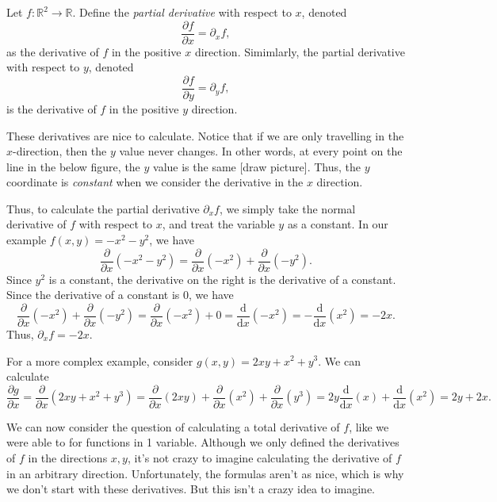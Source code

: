 \begin{definition}\label{dfn:1-1}
	Let $f : \mathbb{R} ^2 \to \mathbb{R} $. Define the \emph{partial derivative} with respect to $x$, denoted
	\[
		\frac{\partial f}{\partial x} =\partial _xf,
	\]
	as the derivative of $f$ in the positive $x$ direction. Simimlarly, the partial derivative with respect to $y$, denoted
	\[
		\frac{\partial f}{\partial y} =\partial _yf,
	\]
	is the derivative of $f$ in the positive $y$ direction.
\end{definition}


These derivatives are nice to calculate. Notice that if we are only travelling in the $x$-direction, then the $y$ value never changes. In other words, at every point on the line in the below figure, the $y$ value is the same [draw picture]. Thus, the $y$ coordinate is \emph{constant} when we consider the derivative in the $x$ direction.

Thus, to calculate the partial derivative $\partial _xf$, we simply take the normal derivative of $f$ with respect to $x$, and treat the variable $y$ as a constant. In our example $f(x,y) = -x^2 - y^2$, we have
\[
	\frac{\partial }{\partial x} \left( -x^2-y^2 \right) = \frac{\partial }{\partial x} \left( -x^2 \right)  + \frac{\partial }{\partial x} \left( -y^2 \right) 
.\]
Since $y^2$ is a constant, the derivative on the right is the derivative of a constant. Since the derivative of a constant is 0, we have
\[
	\frac{\partial}{\partial x} \left( -x^2 \right) + \frac{\partial }{\partial x} \left( -y^2 \right)  = \frac{\partial }{\partial x} \left( -x^2 \right)+0 = \frac{\mathrm{d}}{\mathrm{d}x} \left( -x^2 \right) =- \frac{\mathrm{d}}{\mathrm{d}x} \left( x^2 \right) =-2x
.\]
Thus, $\partial _xf=-2x$.

For a more complex example, consider $g(x,y) = 2xy + x^2 + y^3$. We can calculate
\[
	\frac{\partial g}{\partial x} = \frac{\partial }{\partial x} \left( 2xy+x^2+y^3 \right) = \frac{\partial }{\partial x} (2xy) + \frac{\partial }{\partial x} \left( x^2 \right) + \frac{\partial }{\partial x} \left( y^3 \right) =2y \frac{\mathrm{d}}{\mathrm{d}x} (x) + \frac{\mathrm{d}}{\mathrm{d}x} \left( x^2 \right) =2y + 2x
.\]

We can now consider the question of calculating a total derivative of $f$, like we were able to for functions in 1 variable. Although we only defined the derivatives of $f$ in the directions $x,y$, it's not crazy to imagine calculating the derivative of $f$ in an arbitrary direction. Unfortunately, the formulas aren't as nice, which is why we don't start with these derivatives. But this isn't a crazy idea to imagine.

